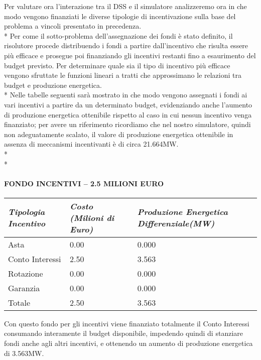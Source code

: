 \documentclass[12pt,a4paper,openright,twoside]{report}
\begin{document}
Per valutare ora l'interazione tra il DSS e il simulatore analizzeremo ora in che modo vengono finanziati le diverse tipologie di incentivazione sulla base del problema a vincoli presentato in precedenza.\\*
Per come il sotto-problema dell'assegnazione dei fondi è stato definito, il risolutore procede distribuendo i fondi a partire dall'incentivo che risulta essere più efficace e prosegue poi finanziando gli incentivi restanti fino a esaurimento del budget previsto. Per determinare quale sia il tipo di incentivo più efficace vengono sfruttate le funzioni lineari a tratti che approssimano le relazioni tra budget e produzione energetica.\\*
Nelle tabelle seguenti sarà mostrato in che modo vengono assegnati i fondi ai vari incentivi a partire da un determinato budget, evidenziando anche l'aumento di produzione energetica ottenibile rispetto al caso in cui nessun incentivo venga finanziato; per avere un riferimento ricordiamo che nel nostro simulatore, quindi non adeguatamente scalato, il valore di produzione energetica ottenibile in assenza di meccanismi incentivanti è di circa 21.664MW.
\\* \\*
\paragraph{FONDO INCENTIVI – 2.5 MILIONI EURO}
\begin{center}
	\begin{tabular}{ | p{4.5cm}  | p{4.5cm} | p{4.5cm} | }
		\hline
		\nohyphens{\emph{Tipologia Incentivo}} & \nohyphens{\emph{Costo (Milioni di Euro)}} & \nohyphens{\emph{Produzione Energetica Differenziale(MW)}} \\ \hline
		Asta &  0.00 & 0.000 \\ \hline
		Conto Interessi & 2.50 & 3.563 \\ \hline
		Rotazione & 0.00 & 0.000 \\ \hline
		Garanzia & 0.00 & 0.000 \\ \hline \hline 
		Totale & 2.50 & 3.563 \\
		\hline
	\end{tabular}
\end{center}
Con questo fondo per gli incentivi viene finanziato totalmente il Conto Interessi consumando interamente il budget disponibile, impedendo quindi di stanziare fondi anche agli altri incentivi, e ottenendo un aumento di produzione energetica di 3.563MW.
\end{document}
